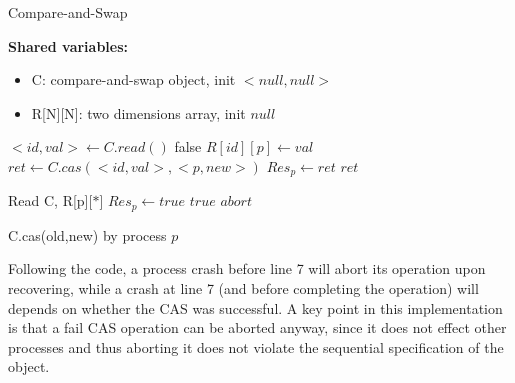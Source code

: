 \begin{algorithm}
	\caption{Compare-and-Swap}\label{recoverable CAS}
	
	\hspace*{\algorithmicindent} \textbf{Shared variables:}
	\begin{itemize}
		\item C: compare-and-swap object, init $<null,null>$
		\item R[N][N]: two dimensions array, init $null$
	\end{itemize}
 
	\begin{algorithmic}[1]
		\State $<id,val> \gets C.read()$
		\State \Return false
		\EndIf
  		\State $R[id][p] \gets val$
		\EndIf
		\State $ret \gets C.cas(<id,val>, <p,new>)$
		\State $Res_p \gets ret$
		\State \Return $ret$
		\EndProcedure
		
		\State Read C, R[p][$*$]
		\State $Res_p \gets true$
		\State \Return $true$
		\Else {}
		\State \Return $abort$
		\EndIf
		\EndProcedure
	\end{algorithmic}
	\caption{C.cas(old,new) by process $p$}
\end{algorithm}


Following the code, a process crash before line 7 will abort its operation upon recovering, while a crash at line 7 (and before completing the operation) will depends on whether the CAS was successful. A key point in this implementation is that a fail CAS operation can be aborted anyway, since it does not effect other processes and thus aborting it does not violate the sequential specification of the object. 




